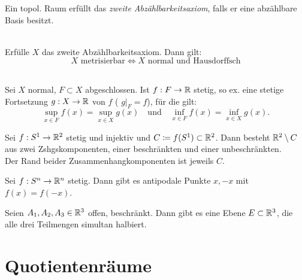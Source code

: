 \documentclass{cheat-sheet}
\begin{document}
\begin{defn}
  Ein topol. Raum erfüllt das \emph{zweite Abzählbarkeitsaxiom}, falls er eine abzählbare Basis besitzt.
\end{defn}

\begin{satz}\mbox{}\\
  Erfülle $X$ das zweite Abzählbarkeitsaxiom. Dann gilt:
  \[ \text{$X$ metrisierbar} \iff \text{$X$ normal und Hausdorffsch} \]
\end{satz}

\begin{satz}\mbox{}\\
  Sei $X$ normal, $F \subset X$ abgeschlossen. Ist $f : F \to \mathbb{R}$ stetig, so ex. eine stetige Fortsetzung $g : X \to \mathbb{R}$ von $f$ (\dh{} $g|_F = f$), für die gilt:
  \[
    \sup_{x \in F} f(x) = \sup_{x \in X} g(x)
    \quad \text{und} \quad
    \inf_{x \in F} f(x) = \inf_{x \in X} g(x).
  \]
\end{satz}



\begin{satz}
  Sei $f : S^1 \to \mathbb{R}^2$ stetig und injektiv und $C \coloneqq f(S^1) \subset \mathbb{R}^2$. Dann besteht $\mathbb{R}^2 \setminus C$ aus zwei Zshgskomponenten, einer beschränkten und einer unbeschränkten. \\
  Der Rand beider Zusammenhangkomponenten ist jeweils $C$.
\end{satz}


\begin{satz}
  Sei $f : S^n \to \mathbb{R}^n$ stetig. Dann gibt es antipodale Punkte $x, -x$ mit $f(x) = f(-x)$.
\end{satz}

\begin{satz}
  Seien $A_1, A_2, A_3 \in \mathbb{R}^3$ offen, beschränkt. Dann gibt es eine Ebene $E \subset \mathbb{R}^3$, die alle drei Teilmengen simultan halbiert.
\end{satz}

\section{Quotientenräume}
\end{document}
